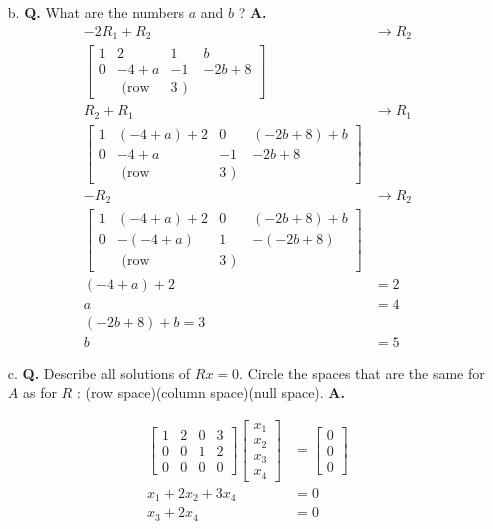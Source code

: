\documentclass[main.tex]{subfiles}
\begin{document}
\begin{enumerate}
\begin{enumerate}
    \item [b.] \textbf{Q.} What are the numbers $a$ and $b$ ? \textbf{A.}
    $$
    \begin{aligned}
    -2R_1+R_2 & \rightarrow R_2\\
    \left[\begin{array}{cccc}
    1 & 2 & 1 & b \\
    0 & -4+a & -1 & -2b+8 \\
    & \text { (row } & 3 \text { ) }
    \end{array}\right]&\\
    R_2+R_1 &\rightarrow R_1\\
    \left[\begin{array}{cccc}
    1 & (-4+a)+2 & 0 & (-2b+8) + b \\
    0 & -4+a & -1 & -2b+8 \\
    & \text { (row } & 3 \text { ) }
    \end{array}\right]&\\
    -R_2 &\rightarrow R_2\\
    \left[\begin{array}{cccc}
    1 & (-4+a)+2 & 0 & (-2b+8) + b \\
    0 & -(-4+a) & 1 & -(-2b+8) \\
    & \text { (row } & 3 \text { ) }
    \end{array}\right]&\\
    (-4+a)+2 & = 2\\
    a & = 4\\
    (-2b+8) + b = 3\\
    b & = 5
    \end{aligned}
    $$

    \item [c.] \textbf{Q.} Describe all solutions of $R x=0$. Circle the spaces that are the same for $A$ as for $R$ : (row space)(column space)(null space). 
    \textbf{A.}
    
    $$
    \begin{aligned}
    \left[\begin{array}{llll}
    1 & 2 & 0 & 3 \\
    0 & 0 & 1 & 2 \\
    0 & 0 & 0 & 0
    \end{array}\right] \left[\begin{array}{l}
    x_1 \\
    x_2 \\
    x_3 \\
    x_4
    \end{array}\right] & = \left[\begin{array}{l}
    0 \\
    0 \\
    0
    \end{array}\right]\\
    x_1 + 2x_2 + 3x_4 &= 0\\
    x_3 + 2x_4 & = 0\\
    \end{aligned}
    $$
    

\end{enumerate}
\end{enumerate}
\end{document}
